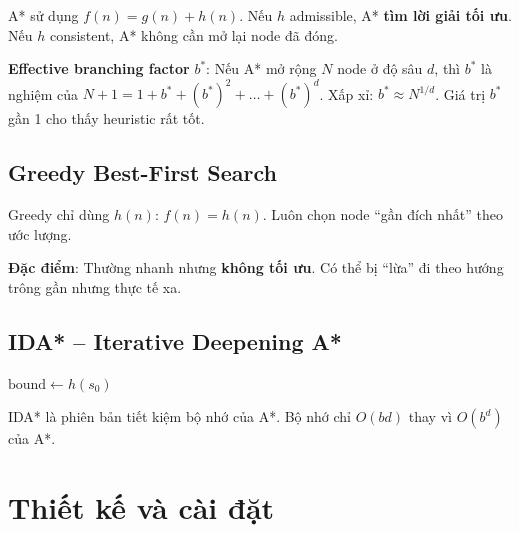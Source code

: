 \documentclass[a4paper,12pt]{article}
\begin{document}
A* sử dụng $f(n) = g(n) + h(n)$. Nếu $h$ admissible, A* \textbf{tìm lời giải tối ưu}. Nếu $h$ consistent, A* không cần mở lại node đã đóng.

\textbf{Effective branching factor} $b^*$: Nếu A* mở rộng $N$ node ở độ sâu $d$, thì $b^*$ là nghiệm của $N + 1 = 1 + b^* + (b^*)^2 + \ldots + (b^*)^d$. Xấp xỉ: $b^* \approx N^{1/d}$. Giá trị $b^*$ gần 1 cho thấy heuristic rất tốt.

\subsection{Greedy Best-First Search}

Greedy chỉ dùng $h(n)$: $f(n) = h(n)$. Luôn chọn node ``gần đích nhất'' theo ước lượng.

\textbf{Đặc điểm}: Thường nhanh nhưng \textbf{không tối ưu}. Có thể bị ``lừa'' đi theo hướng trông gần nhưng thực tế xa.

\subsection{IDA* -- Iterative Deepening A*}

\begin{algorithm}[H]
\caption{IDA* -- Iterative Deepening A*}
\label{alg:idastar}
$\text{bound} \leftarrow h(s_0)$\;
\BlankLine
{}
\end{algorithm}

IDA* là phiên bản tiết kiệm bộ nhớ của A*. Bộ nhớ chỉ $O(bd)$ thay vì $O(b^d)$ của A*.

\section{Thiết kế và cài đặt}
\end{document}
